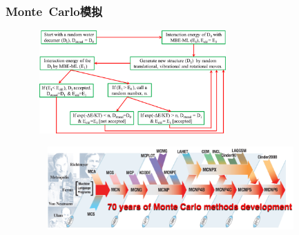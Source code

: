 \frame
{
	\frametitle{\textrm{Monte~Carlo}模拟}
\begin{minipage}{0.33\textwidth}
\begin{itemize}
\vspace{-8.0pt}
{\fontsize{9.5pt}{6.2pt}}
\end{itemize}
\end{minipage}
\begin{minipage}{0.65\textwidth}
\begin{figure}[h!]
\centering
\vspace{-5.0pt}
\includegraphics[height=1.55in,width=3.00in,viewport=0 0 930 475,clip]{Figures/Schematic-representation-of-the-Metropolis-Monte-Carlo-simulation.png}
\label{MC-Algorithm-Workflow}
\end{figure}
\end{minipage}
\begin{figure}[h!]
\centering
\vspace{-10.0pt}
\includegraphics[height=1.25in,width=4.15in,viewport=0 0 1470 480,clip]{Figures/Monte-Carlo-development.png}
\label{Monte-Carlo-development}
\end{figure}
}

